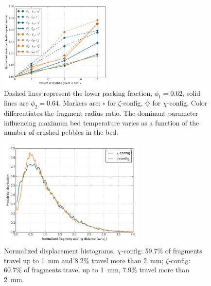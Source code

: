 \begin{figure}[!t]
    \centering
    \includegraphics[width = 0.5\textwidth]{figures/eta-T_max.png}
    \caption{Dashed lines represent the lower packing fraction, $\phi_1 = 0.62$, solid lines are $\phi_2 = 0.64$. Markers are: $\circ$ for $\zeta$-config, $\diamondsuit$ for $\chi$-config. Color differentiates the fragment radius ratio. The dominant parameter influencing maximum bed temperature varies as a function of the number of crushed pebbles in the bed.}\label{fig:eta-T_max}
\end{figure}

\begin{figure}[!t]
    \centering
    \includegraphics[width = 0.65\textwidth]{figures/displacement_histograms.png}
    \caption{Normalized displacement histograms. $\chi$-config: 59.7\% of fragments travel up to \SI{1}{\milli\meter} and 8.2\% travel more than \SI{2}{\milli\meter}; $\zeta$-config: 60.7\% of fragments travel up to \SI{1}{\milli\meter}, 7.9\% travel more than \SI{2}{\milli\meter}.}\label{fig:displacement_hists}
\end{figure}


